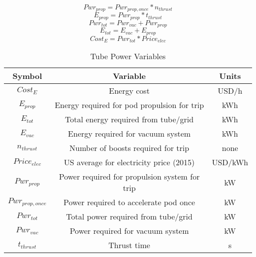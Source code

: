 \begin{equation}
	Pwr_{prop} = Pwr_{prop,once} * n_{thrust}
\end{equation}
\begin{equation}
E_{prop} = Pwr_{prop} * t_{thrust}
\end{equation}
\begin{equation}
Pwr_{tot} = Pwr_{vac} + Pwr_{prop}
\end{equation}
\begin{equation}
E_{tot} = E_{vac} + E_{prop}
\end{equation}
\begin{equation}
Cost_{E} = Pwr_{tot} * Price_{elec}
\end{equation}
\begin{table}[ht]
\caption{Tube Power Variables} %
\centering %
\begin{tabular}{c c c} %
\hline\hline %
Symbol & Variable & Units \\ [0.5ex] %
\hline %
$Cost_{E}$ & Energy cost & USD/h\\
$E_{prop}$ & Energy required for pod propulsion for trip& kWh\\
$E_{tot}$ & Total energy required from tube/grid & kWh\\
$E_{vac}$&Energy required for vacuum system & kWh\\
$n_{thrust}$ & Number of boosts required for trip & none\\
$Price_{elec}$&US average for electricity price (2015)& USD/kWh\\
$Pwr_{prop}$ & Power required for propulsion system for trip & kW\\
$ Pwr_{prop,once}$ & Power required to accelerate pod once & kW\\
$Pwr_{tot}$ & Total power required from tube/grid & kW\\
$Pwr_{vac}$ & Power required for vacuum system & kW\\
$t_{thrust}$ & Thrust time & s\\
\hline %
\end{tabular}
\label{tbl:tube_power_vars} %
\end{table}
